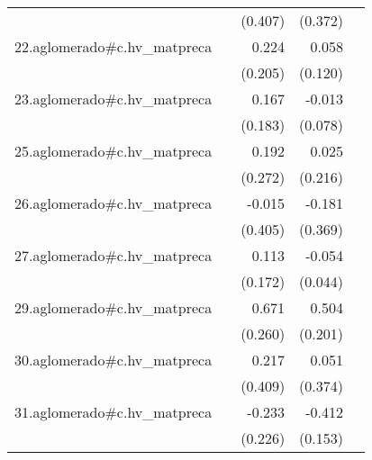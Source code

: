 {\begin{longtable}{l*{4}{D{.}{.}{-1}}}
            &                     &     (0.407)         &     (0.372)         &                     \\
\addlinespace
22.aglomerado#c.hv\_matpreca&                     &       0.224         &       0.058         &                     \\
            &                     &     (0.205)         &     (0.120)         &                     \\
\addlinespace
23.aglomerado#c.hv\_matpreca&                     &       0.167         &      -0.013         &                     \\
            &                     &     (0.183)         &     (0.078)         &                     \\
\addlinespace
25.aglomerado#c.hv\_matpreca&                     &       0.192         &       0.025         &                     \\
            &                     &     (0.272)         &     (0.216)         &                     \\
\addlinespace
26.aglomerado#c.hv\_matpreca&                     &      -0.015         &      -0.181         &                     \\
            &                     &     (0.405)         &     (0.369)         &                     \\
\addlinespace
27.aglomerado#c.hv\_matpreca&                     &       0.113         &      -0.054         &                     \\
            &                     &     (0.172)         &     (0.044)         &                     \\
\addlinespace
29.aglomerado#c.hv\_matpreca&                     &       0.671\sym{**} &       0.504\sym{*}  &                     \\
            &                     &     (0.260)         &     (0.201)         &                     \\
\addlinespace
30.aglomerado#c.hv\_matpreca&                     &       0.217         &       0.051         &                     \\
            &                     &     (0.409)         &     (0.374)         &                     \\
\addlinespace
31.aglomerado#c.hv\_matpreca&                     &      -0.233         &      -0.412\sym{**} &                     \\
            &                     &     (0.226)         &     (0.153)         &                     \\

\end{longtable}}
